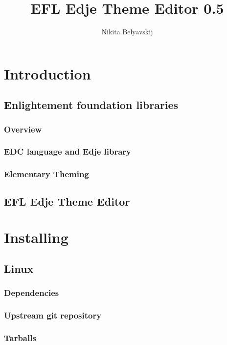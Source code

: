 \documentclass[titlepage,oneside,11pt]{book}
\author{Nikita Belyavskij}
\title{EFL Edje Theme Editor 0.5}
\begin{document}
\maketitle
\tableofcontents
\chapter{Introduction}
\section{Enlightement foundation libraries}
\subsection{Overview}
\subsection{EDC language and Edje library}
\subsection{Elementary Theming}
\newpage
\section{EFL Edje Theme Editor}
\chapter{Installing}
\section{Linux}
\subsection{Dependencies}
\subsection{Upstream git repository}
\subsection{Tarballs}
\end{document}
